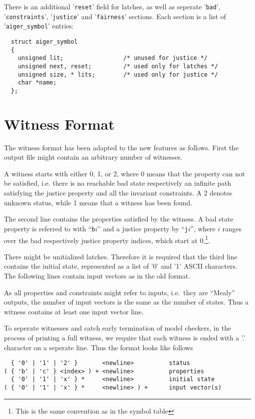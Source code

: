 \documentclass{llncs}
\begin{document}
There is an additional '\texttt{reset}' field for latches, as well as 
seperate '\texttt{bad}', '\texttt{constraints}', '\texttt{justice}' and
'\texttt{fairness}' sections.  Each section
is a list of '\texttt{aiger\_symbol}' entries:

{\small
\begin{verbatim}
  struct aiger_symbol
  {
    unsigned lit;                 /* unused for justice */
    unsigned next, reset;         /* used only for latches */
    unsigned size, * lits;        /* used only for justice */
    char *name;
  };
\end{verbatim}}

\section{Witness Format}

The witness format has been adapted to the new features as follows.
First the output file might contain an arbitrary number of witnesses.

A witness starts with either 0, 1, or 2, where 0 means that the property can
not be satisfied, i.e. there is no reachable bad state respectively an
infinite path satisfying the justice property and all the invariant
constraints.  A 2 denotes unknown status, while 1 means that a witness
has been found.

The second line contains the properties satisfied by the witness.
A bad state property is referred to with ``\texttt{b}$i$'' and a
justice property by ``\texttt{j}$i$'', where $i$ ranges over the bad
respectively justice property indices, which start at 0.\footnote{This is 
the same convention as in the symbol table}.

There might be unitialized latches.  Therefore it is required that the third
line contains the initial state, represented as a list of '0' and '1' ASCII
characters.  The following lines contain input vectors as in the old format.

As all properties and constraints might refer to inputs, i.e.~they are ``Mealy''
outputs, the number of input vectors is the same as the number of states.
Thus a witness contains at least one input vector line.

To seperate witnesses and catch early termination of model checkers, in the
process of printing a full witness, we require that each witness is
ended with a '.' character on a seperate line.
Thus the format looks like follows
{\small
\begin{verbatim}
  { '0' | '1' | '2' }       <newline>          status
( { 'b' | 'c' } <index> ) + <newline>          properties
  { '0' | '1' | 'x' } *     <newline>          initial state
( { '0' | '1' | 'x' } *     <newline> ) +      input vector(s)
\end{verbatim}}
\end{document}
